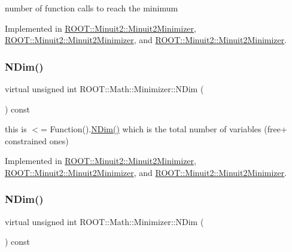 number of function calls to reach the minimum 



Implemented in \mbox{\hyperlink{classROOT_1_1Minuit2_1_1Minuit2Minimizer_ab5faf7c3dc0b3743eee8352c62a6ccfd}{R\+O\+O\+T\+::\+Minuit2\+::\+Minuit2\+Minimizer}}, \mbox{\hyperlink{classROOT_1_1Minuit2_1_1Minuit2Minimizer_ab5faf7c3dc0b3743eee8352c62a6ccfd}{R\+O\+O\+T\+::\+Minuit2\+::\+Minuit2\+Minimizer}}, and \mbox{\hyperlink{classROOT_1_1Minuit2_1_1Minuit2Minimizer_ab5faf7c3dc0b3743eee8352c62a6ccfd}{R\+O\+O\+T\+::\+Minuit2\+::\+Minuit2\+Minimizer}}.

\mbox{\label{classROOT_1_1Math_1_1Minimizer_aecb9b9ee5c6a9fd7db3196ae3ac5e335}} 
\subsubsection{\texorpdfstring{NDim()}{NDim()}\hspace{0.1cm}{\footnotesize\ttfamily [1/3]}}
{\footnotesize\ttfamily virtual unsigned int R\+O\+O\+T\+::\+Math\+::\+Minimizer\+::\+N\+Dim (\begin{DoxyParamCaption}{ }\end{DoxyParamCaption}) const\hspace{0.3cm}{\ttfamily [pure virtual]}}

this is $<$= Function().\mbox{\hyperlink{classROOT_1_1Math_1_1Minimizer_aecb9b9ee5c6a9fd7db3196ae3ac5e335}{N\+Dim()}} which is the total number of variables (free+ constrained ones) 

Implemented in \mbox{\hyperlink{classROOT_1_1Minuit2_1_1Minuit2Minimizer_a6ed2c7d99296e222f0f43295e302eb9e}{R\+O\+O\+T\+::\+Minuit2\+::\+Minuit2\+Minimizer}}, \mbox{\hyperlink{classROOT_1_1Minuit2_1_1Minuit2Minimizer_a6ed2c7d99296e222f0f43295e302eb9e}{R\+O\+O\+T\+::\+Minuit2\+::\+Minuit2\+Minimizer}}, and \mbox{\hyperlink{classROOT_1_1Minuit2_1_1Minuit2Minimizer_a6ed2c7d99296e222f0f43295e302eb9e}{R\+O\+O\+T\+::\+Minuit2\+::\+Minuit2\+Minimizer}}.

\mbox{\label{classROOT_1_1Math_1_1Minimizer_aecb9b9ee5c6a9fd7db3196ae3ac5e335}} 
\subsubsection{\texorpdfstring{NDim()}{NDim()}\hspace{0.1cm}{\footnotesize\ttfamily [2/3]}}
{\footnotesize\ttfamily virtual unsigned int R\+O\+O\+T\+::\+Math\+::\+Minimizer\+::\+N\+Dim (\begin{DoxyParamCaption}{ }\end{DoxyParamCaption}) const\hspace{0.3cm}{\ttfamily [pure virtual]}}


